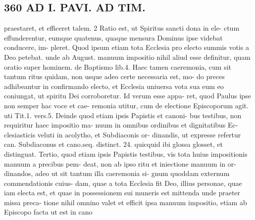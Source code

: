 \documentclass{article}
\begin{document}
\begin{pages}
\section*{360 AD I. PAVI. AD TIM. }praestaret, et efficeret talem. 2 Ratio est, ut Spiritus sancti dona in ele- ctum effunderentur, eumque quatenus, quaque mensura Dominus ipse videbat conducere, im- pleret. Quod ipsum etiam tota Ecclesia pro electo summis votis a Deo petebat. unde ab August. manuum impositio nihil aliud esse definitur, quam oratio super hominem. de Baptismo lib.4. Haec tamen caeremonia, cum sit tantum ritus quidam, non usque adeo certe necessaria est, mo- do preces adhibeantur in confirmando electo, et Ecclesia uniuersa vota sua eum eo coniungat, ut spiritu Dei corroboretur. Id verum esse appa- ret, quod Paulus ipse non semper hac voce et cae- remonia utitur, cum de electione Episcoporum agit. uti Tit.1. vers.5. Deinde quod etiam ipsis Papistis et canoni- bus testibus, non requiritur haec impositio ma- nuum in omnibus ordinibus et dignitatibus Ec- clesiasticis veluti in acolytho, et Subdiaconis or- dinandis, ut expresse refertur can. Subdiaconus et cano.seq. distinct. 24. quicquid ibi glossa glosset, et distinguat. Tertio, quod etiam ipsis Papistis testibus, vis tota huius impositionis manuum a precibus pem- deat, non ab ipso ritu et iniectione manuum in or- dinandos, adeo ut sit tantum illa caeremonia si- gnum quoddam externum commendationis cuius- dam, quae a tota Ecclesia fit Deo, illius personae, quae iam electa est, et quae in possessionem sui muneris est mittenda unde praeter missa preca- tione nihil omnino valet et efficit ipsa manuum impositio, etiam ab Episcopo facta ut est in cano 

\end{pages}
\end{document}
